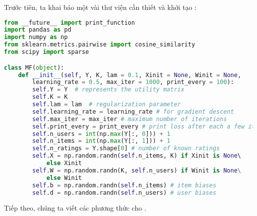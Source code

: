 Trước tiên, ta khai báo một vài thư viện cần thiết và khởi tạo
:
\begin{lstlisting}[language=Python]
from __future__ import print_function
import pandas as pd
import numpy as np
from sklearn.metrics.pairwise import cosine_similarity
from scipy import sparse

class MF(object):
    def __init__(self, Y, K, lam = 0.1, Xinit = None, Winit = None,
        learning_rate = 0.5, max_iter = 1000, print_every = 100):
        self.Y = Y  # represents the utility matrix
        self.K = K  
        self.lam = lam  # regularization parameter
        self.learning_rate = learning_rate # for gradient descent
        self.max_iter = max_iter # maximum number of iterations
        self.print_every = print_every # print loss after each a few iters
        self.n_users = int(np.max(Y[:, 0])) + 1
        self.n_items = int(np.max(Y[:, 1])) + 1
        self.n_ratings = Y.shape[0] # number of known ratings
        self.X = np.random.randn(self.n_items, K) if Xinit is None\ 
            else Xinit
        self.W = np.random.randn(K, self.n_users) if Winit is None\
            else Winit
        self.b = np.random.randn(self.n_items) # item biases
        self.d = np.random.randn(self.n_users) # user biases
\end{lstlisting}
Tiếp theo, chúng ta viết các phương thức
 cho .
